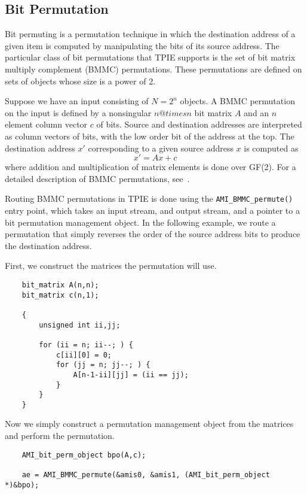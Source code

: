 \subsection{Bit Permutation}
\label{sec:bit-permuting}

Bit permuting is a permutation technique in which the destination
address of a given item is computed by manipulating the bits of its
source address.  The particular class of bit permutations that TPIE
supports is the set of bit matrix multiply complement (BMMC)
permutations.  These permutations are defined on sets of objects whose
size is a power of 2.

Suppose we have an input consisting of $N = 2^n$ objects.  A BMMC
permutation on the input is defined by a nonsingular $n @times n$ bit
matrix $A$ and an $n$ element column vector $c$ of bits.  Source and
destination addresses are interpreted as column vectors of bits, with
the low order bit of the address at the top.  The destination address
$x'$ corresponding to a given source address $x$ is computed as
$$x' = Ax + c$$ where addition and multiplication of matrix elements
is done over GF(2).  For a detailed description of BMMC permutations,
see~\cite{cormen:integrate-tr}.

Routing BMMC permutations in TPIE is done using the
\verb|AMI_BMMC_permute()| entry point, which takes an input stream,
and output stream, and a pointer to a bit permutation management
object.  In the following example, we route a permutation that simply
reverses the order of the source address bits to produce the
destination address.

First, we construct the matrices the permutation will use.
\begin{verbatim}
    bit_matrix A(n,n);
    bit_matrix c(n,1);

    {
        unsigned int ii,jj;

        for (ii = n; ii--; ) {
            c[ii][0] = 0;
            for (jj = n; jj--; ) {
                A[n-1-ii][jj] = (ii == jj);
            }
        }
    }
\end{verbatim}
Now we simply construct a permutation management object from the
matrices and perform the permutation.
\begin{verbatim}
    AMI_bit_perm_object bpo(A,c);
    
    ae = AMI_BMMC_permute(&amis0, &amis1, (AMI_bit_perm_object *)&bpo);
\end{verbatim}


